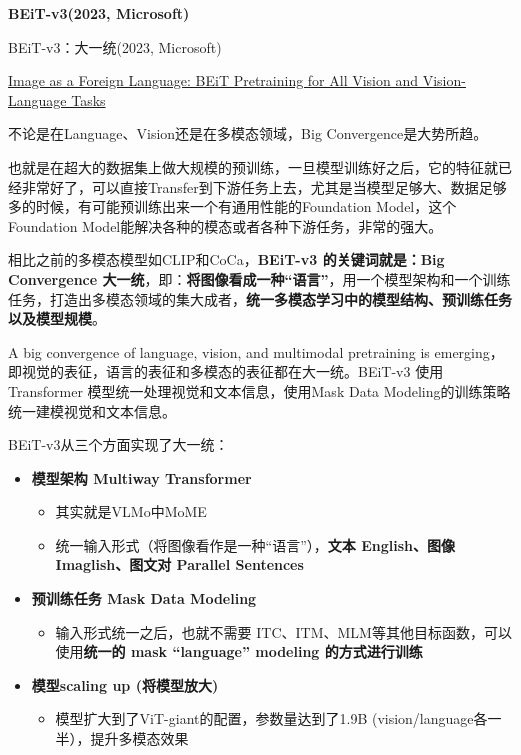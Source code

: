 \documentclass[zihao=false,fontset=windows]{ctexart}
\newcommand{\rb}[1]{\textcolor{feishuRed}{\textbf{#1}}}
\begin{document}
{\bfseries BEiT-v3(2023, Microsoft)\par}

\begin{feishuquote}
BEiT-v3：大一统(2023, Microsoft)\par
\href{https://arxiv.org/abs/2208.10442}{Image as a Foreign Language: BEiT Pretraining for All Vision and Vision-Language Tasks}\par
\end{feishuquote}

不论是在Language、Vision还是在多模态领域，Big Convergence是大势所趋。\par

\begin{feishuquote}
也就是在超大的数据集上做大规模的预训练，一旦模型训练好之后，它的特征就已经非常好了，可以直接Transfer到下游任务上去，尤其是当模型足够大、数据足够多的时候，有可能预训练出来一个有通用性能的Foundation Model，这个Foundation Model能解决各种的模态或者各种下游任务，非常的强大。\par
\end{feishuquote}

相比之前的多模态模型如CLIP和CoCa，\rb{BEiT-v3 的关键词就是：Big Convergence 大一统}，即：\rb{将图像看成一种“语言”}，用一个模型架构和一个训练任务，打造出多模态领域的集大成者，\textbf{统一多模态学习中的模型结构、预训练任务以及模型规模}。\par

A big convergence of language, vision, and multimodal pretraining is emerging，即视觉的表征，语言的表征和多模态的表征都在大一统。BEiT-v3 使用 Transformer 模型统一处理视觉和文本信息，使用Mask Data Modeling的训练策略统一建模视觉和文本信息。\par

BEiT-v3从三个方面实现了大一统：\par
\begin{itemize}
\item \rb{模型架构 Multiway Transformer}
\begin{itemize}
\item 其实就是VLMo中MoME
\item 统一输入形式（将图像看作是一种“语言”），\textbf{文本 English、图像 Imaglish、图文对 Parallel Sentences}
\end{itemize}
\item \rb{预训练任务 Mask Data Modeling}
\begin{itemize}
\item 输入形式统一之后，也就不需要 ITC、ITM、MLM等其他目标函数，可以使用\textbf{统一的 mask “language” modeling 的方式进行训练}
\end{itemize}
\item \rb{模型scaling up (将模型放大)}
\begin{itemize}
\item 模型扩大到了ViT-giant的配置，参数量达到了1.9B (vision/language各一半），提升多模态效果
\end{itemize}
\end{itemize}
\end{document}
